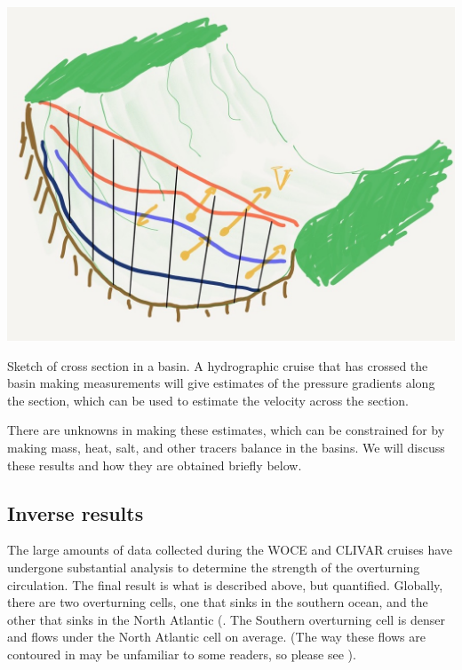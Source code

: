 \begin{marginfigure}
    \includegraphics{figs/WaterMasses/SketchCrossSection}
    \caption{Sketch of cross section in a basin.  A hydrographic cruise that has crossed the basin making measurements will give estimates of the pressure gradients along the section, which can be used to estimate the velocity across the section.}
    \label{fig:SketchCrossSection}
\end{marginfigure}


There are unknowns in making these estimates, which can be constrained for by making mass, heat, salt, and other tracers balance in the basins.  We will discuss these results and how they are obtained briefly below.


\subsection{Inverse results}
\label{sec:inverse_results}

The large amounts of data collected during the WOCE and CLIVAR cruises have undergone substantial analysis to determine the strength of the overturning circulation.  The final result is what is described above, but quantified.
Globally, there are two overturning cells, one that sinks in the southern ocean, and the other that sinks in the North Atlantic (.  The Southern overturning cell is denser and flows under the North Atlantic cell on average.  
(The way these flows are contoured in  may be unfamiliar to some readers, so please see ).  

